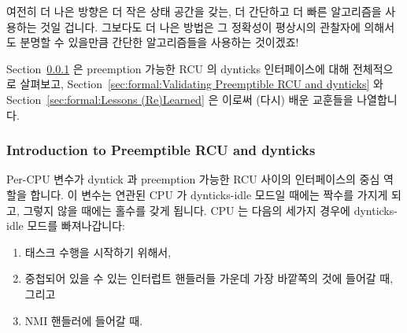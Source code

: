 여전히 더 나은 방향은 더 작은 상태 공간을 갖는, 더 간단하고 더 빠른 알고리즘을
사용하는 것일 겁니다.
그보다도 더 나은 방법은 그 정확성이 평상시의 관찰자에 의해서도 분명할 수
있을만큼 간단한 알고리즘들을 사용하는 것이겠죠!
\iffalse

Still better would be to come up with a simpler and faster algorithm
that has a smaller state space.
Even better would be an algorithm so simple that its correctness was
obvious to the casual observer!
\fi

Section~\ref{sec:formal:Introduction to Preemptible RCU and dynticks}
은 preemption 가능한 RCU 의 dynticks 인터페이스에 대해 전체적으로 살펴보고,
Section~\ref{sec:formal:Validating Preemptible RCU and dynticks} 와
Section~\ref{sec:formal:Lessons (Re)Learned} 은 이로써 (다시) 배운 교훈들을
나열합니다.
\iffalse

Section~\ref{sec:formal:Introduction to Preemptible RCU and dynticks}
gives an overview of preemptible RCU's dynticks interface,
Section~\ref{sec:formal:Validating Preemptible RCU and dynticks},
and
Section~\ref{sec:formal:Lessons (Re)Learned} lists
lessons (re)learned during this effort.
\fi

\subsubsection{Introduction to Preemptible RCU and dynticks}
\label{sec:formal:Introduction to Preemptible RCU and dynticks}

Per-CPU  변수가 dyntick 과 preemption 가능한 RCU
사이의 인터페이스의 중심 역할을 합니다.
이 변수는 연관된 CPU 가 dynticks-idle 모드일 때에는 짝수를 가지게 되고, 그렇지
않을 때에는 홀수를 갖게 됩니다.
CPU 는 다음의 세가지 경우에 dynticks-idle 모드를 빠져나갑니다:
\iffalse

The per-CPU \co{dynticks_progress_counter} variable is
central to the interface between dynticks and preemptible RCU.
This variable has an even value whenever the corresponding CPU
is in dynticks-idle mode, and an odd value otherwise.
A CPU exits dynticks-idle mode for the following three reasons:
\fi

\begin{enumerate}
\item	태스크 수행을 시작하기 위해서,
\item	중첩되어 있을 수 있는 인터럽트 핸들러들 가운데 가장 바깥쪽의 것에
	들어갈 때, 그리고
\item	NMI 핸들러에 들어갈 때.
\iffalse

\item	to start running a task,
\item	when entering the outermost of a possibly nested set of interrupt
	handlers, and
\item	when entering an NMI handler.
\fi
\end{enumerate}

